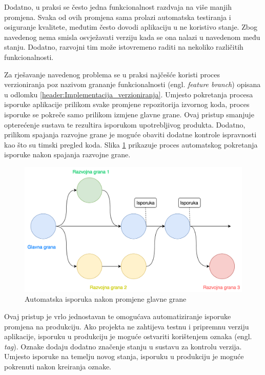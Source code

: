 \documentclass[times, utf8, diplomski, numeric]{fer}
\newcommand{\eng}[1]{(engl. \textit{#1})}
\begin{document}
Dodatno, u praksi se često jedna funkcionalnost razdvaja na više manjih promjena. Svaka od ovih promjena sama prolazi automatska testiranja i osiguranje kvalitete, međutim često dovodi aplikaciju u ne koristivo stanje. Zbog navedenog nema smisla osvježavati verziju kada se ona nalazi u navedenom među stanju. Dodatno, razvojni tim može istovremeno raditi na nekoliko različitih funkcionalnosti.

Za rješavanje navedenog problema se u praksi najčešće koristi proces verzioniranja poz nazivom grananje funkcionalnosti \eng{feature branch} opisana u odlomku \ref{header:Implementacija_verzioniranja}. Umjesto pokretanja procesa isporuke aplikacije prilikom svake promjene repozitorija izvornog koda, proces isporuke se pokreče samo prilikom izmjene glavne grane. Ovaj pristup smanjuje opterećenje sustava te rezultira isporukom upotrebljivog produkta. Dodatno, prilikom spajanja razvojne grane je moguće obaviti dodatne kontrole ispravnosti kao što su timski pregled koda. Slika \ref{fig:FeatureBranchCD} prikazuje proces automatskog pokretanja isporuke nakon spajanja razvojne grane.

\begin{figure}
\centering
\includegraphics[scale=0.5]{FeatureBranchCD}
\caption{Automatska isporuka nakon promjene glavne grane}
\label{fig:FeatureBranchCD}
\end{figure}

Ovaj pristup je vrlo jednostavan te omogućava automatiziranje isporuke promjena na produkciju. Ako projekta ne zahtijeva testnu i pripremnu verziju aplikacije, isporuku u produkciju je moguće ostvariti korištenjem oznaka \eng{tag}. Oznake dodaju dodatno značenje stanju u sustavu za kontrolu verzija. Umjesto isporuke na temelju novog stanja, isporuku u produkciju je moguće pokrenuti nakon kreiranja oznake.
\end{document}
